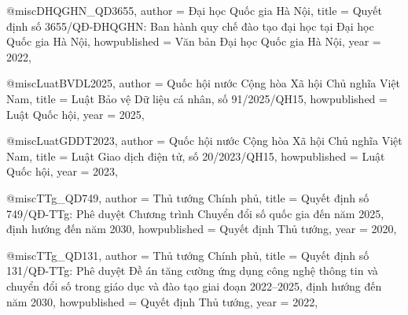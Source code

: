 @misc{DHQGHN_QD3655,
  author       = {{Đại học Quốc gia Hà Nội}},
  title        = {Quyết định số 3655/{QĐ}-{ĐHQGHN}: Ban hành quy chế đào tạo
                  đại học tại Đại học Quốc gia Hà Nội},
  howpublished = {Văn bản Đại học Quốc gia Hà Nội},
  year         = {2022},
}


@misc{LuatBVDL2025,
  author       = {{Quốc hội nước Cộng hòa Xã hội Chủ nghĩa Việt Nam}},
  title        = {Luật Bảo vệ Dữ liệu cá nhân, số 91/2025/{QH15}},
  howpublished = {Luật Quốc hội},
  year         = {2025},
}

@misc{LuatGDDT2023,
  author       = {{Quốc hội nước Cộng hòa Xã hội Chủ nghĩa Việt Nam}},
  title        = {Luật Giao dịch điện tử, số 20/2023/{QH15}},
  howpublished = {Luật Quốc hội},
  year         = {2023},
}


@misc{TTg_QD749,
  author       = {{Thủ tướng Chính phủ}},
  title        = {Quyết định số 749/{QĐ}-{TTg}: Phê duyệt Chương trình Chuyển
                  đổi số quốc gia đến năm 2025, định hướng đến năm 2030},
  howpublished = {Quyết định Thủ tướng},
  year         = {2020},
}

@misc{TTg_QD131,
  author       = {{Thủ tướng Chính phủ}},
  title        = {Quyết định số 131/{QĐ}-{TTg}: Phê duyệt Đề án tăng cường
                  ứng dụng công nghệ thông tin và chuyển đổi số trong giáo
                  dục và đào tạo giai đoạn 2022--2025, định hướng đến năm
                  2030},
  howpublished = {Quyết định Thủ tướng},
  year         = {2022},
}